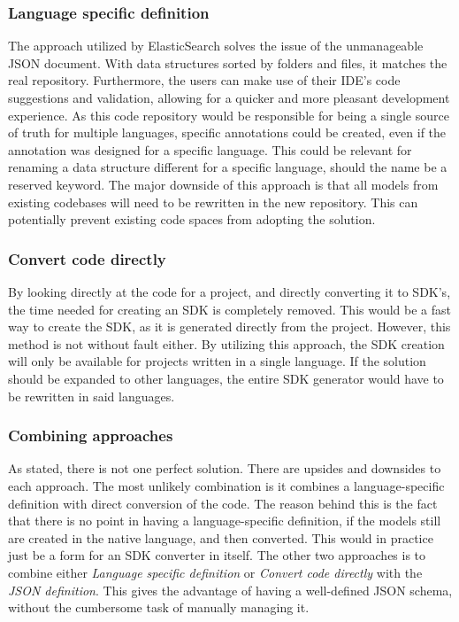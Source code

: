\subsubsection*{Language specific definition}
The approach utilized by ElasticSearch solves the issue of the unmanageable JSON document. With data structures sorted by folders and files, it matches the real repository.
Furthermore, the users can make use of their IDE's code suggestions and validation, allowing for a quicker and more pleasant development experience.
As this code repository would be responsible for being a single source of truth for multiple languages, specific annotations could be created, even if the annotation was designed for a specific language. This could be relevant for renaming a data structure different for a specific language, should the name be a reserved keyword. 
The major downside of this approach is that all models from existing codebases will need to be rewritten in the new repository. This can potentially prevent existing code spaces from adopting the solution.

\subsubsection*{Convert code directly}
By looking directly at the code for a project, and directly converting it to SDK's, the time needed for creating an SDK is completely removed. 
This would be a fast way to create the SDK, as it is generated directly from the project. 
However, this method is not without fault either. By utilizing this approach, the SDK creation will only be available for projects written in a single language. If the solution should be expanded to other languages, the entire SDK generator would have to be rewritten in said languages.

\subsubsection*{Combining approaches}
As stated, there is not one perfect solution. There are upsides and downsides to each approach. The most unlikely combination is it combines a language-specific definition with direct conversion of the code. The reason behind this is the fact that there is no point in having a language-specific definition, if the models still are created in the native language, and then converted. This would in practice just be a form for an SDK converter in itself.
The other two approaches is to combine either \textit{Language specific definition} or \textit{Convert code directly} with the \textit{JSON definition}. This gives the advantage of having a well-defined JSON schema, without the cumbersome task of manually managing it.

